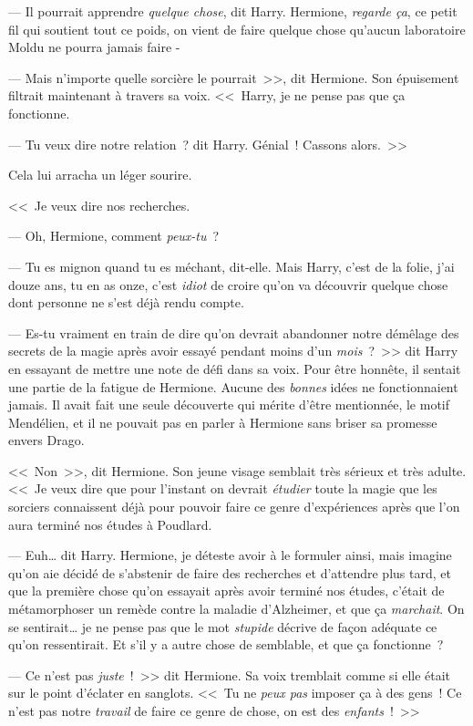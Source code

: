 --- Il pourrait apprendre \emph{quelque chose}, dit Harry. Hermione, \emph{regarde ça}, ce petit fil qui soutient tout ce poids, on vient de faire quelque chose qu'aucun laboratoire Moldu ne pourra jamais faire -

--- Mais n'importe quelle sorcière le pourrait~>>, dit Hermione. Son épuisement filtrait maintenant à travers sa voix. <<~Harry, je ne pense pas que ça fonctionne.

--- Tu veux dire notre relation~? dit Harry. Génial~! Cassons alors.~>>

Cela lui arracha un léger sourire.

<<~Je veux dire nos recherches.

--- Oh, Hermione, comment \emph{peux-tu}~?

--- Tu es mignon quand tu es méchant, dit-elle. Mais Harry, c'est de la folie, j'ai douze ans, tu en as onze, c'est \emph{idiot} de croire qu'on va découvrir quelque chose dont personne ne s'est déjà rendu compte.

--- Es-tu vraiment en train de dire qu'on devrait abandonner notre démêlage des secrets de la magie après avoir essayé pendant moins d'un \emph{mois}~?~>> dit Harry en essayant de mettre une note de défi dans sa voix. Pour être honnête, il sentait une partie de la fatigue de Hermione. Aucune des \emph{bonnes} idées ne fonctionnaient jamais. Il avait fait une seule découverte qui mérite d'être mentionnée, le motif Mendélien, et il ne pouvait pas en parler à Hermione sans briser sa promesse envers Drago.

<<~Non~>>, dit Hermione. Son jeune visage semblait très sérieux et très adulte. <<~Je veux dire que pour l'instant on devrait \emph{étudier} toute la magie que les sorciers connaissent déjà pour pouvoir faire ce genre d'expériences après que l'on aura terminé nos études à Poudlard.

--- Euh… dit Harry. Hermione, je déteste avoir à le formuler ainsi, mais imagine qu'on aie décidé de s'abstenir de faire des recherches et d'attendre plus tard, et que la première chose qu'on essayait après avoir terminé nos études, c'était de métamorphoser un remède contre la maladie d'Alzheimer, et que ça \emph{marchait}. On se sentirait… je ne pense pas que le mot \emph{stupide} décrive de façon adéquate ce qu'on ressentirait. Et s'il y a autre chose de semblable, et que ça fonctionne~?

--- Ce n'est pas \emph{juste}~!~>> dit Hermione. Sa voix tremblait comme si elle était sur le point d'éclater en sanglots. <<~Tu ne \emph{peux pas} imposer ça à des gens~! Ce n'est pas notre \emph{travail} de faire ce genre de chose, on est des \emph{enfants}~!~>>

